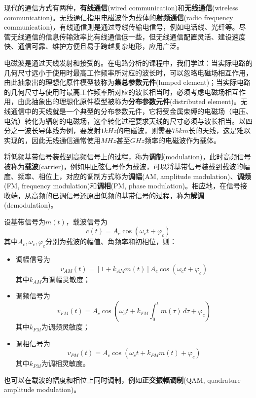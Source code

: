 现代的通信方式有两种\cite{electronic_circuits}，\textbf{有线通信}(wired communication)和\textbf{无线通信}(wireless communication)。无线通信指用电磁波作为载体的\textbf{射频通信}(radio frequency communication)，有线通信则是通过导线传输电信号，例如电话线、光纤等。尽管无线通信的信息传输效率比有线通信低一些，但无线通信配置灵活、建设速度快、通信可靠、维护方便且易于跨越复杂地形，应用广泛。

电磁波是通过天线发射和接受的。在电路分析的课程中，我们学过：当实际电路的几何尺寸远小于使用时最高工作频率所对应的波长时，可以忽略电磁场相互作用，由此抽象出的理想化原件模型被称为\textbf{集总参数元件}(lumped element)；当实际电路的几何尺寸与使用时最高工作频率所对应的波长相当时，必须考虑电磁场相互作用，由此抽象出的理想化原件模型被称为\textbf{分布参数元件}(distributed element)。无线通信中的天线就是一个典型的分布参数元件，它将受金属束缚的电磁场（电压、电流）转化为辐射的电磁场，这个转化过程要求天线的尺寸必须与波长相当。以四分之一波长导体线为例，要发射$1kHz$的电磁波，则需要$75km$长的天线，这是难以实现的，因此无线通信通常使用$MHz$甚至$GHz$频率的电磁波作为载体。

将低频基带信号装载到高频信号上的过程，称为\textbf{调制}(modulation)，此时高频信号被称为\textbf{载波}(carrier)，例如用正弦信号作为载波，可以将基带信号装载到载波的幅度、频率、相位上，对应的调制方式称为\textbf{调幅}(AM, amplitude modulation)、\textbf{调频}(FM, frequency modulation)和\textbf{调相}(PM, phase modulation)。相应地，在信号接收端，从高频的已调信号还原出低频的基带信号的过程，称为\textbf{解调}(demodulation)。
\begin{definition}[调频、调幅、调相]
    设基带信号为$m(t)$，载波信号为\[c(t)=A_c \cos(\omega_c t+\varphi_c)\]
    其中$A_c,\omega_c,\varphi_c$分别为载波的幅值、角频率和初相位，则：
    \begin{itemize}
        \item 调幅信号为\[v_{AM}(t)=[1+k_{AM} m(t)]A_c \cos(\omega_c t+\varphi_c)\]其中$k_{AM}$为调幅灵敏度；
        \item 调频信号为\[v_{FM}(t)=A_c \cos\left(\omega_c t+k_{FM}\int_{0}^{t}m(\tau)\,d\tau+\varphi_c\right)\]其中$k_{FM}$为调频灵敏度；
        \item 调相信号为\[v_{PM}(t)=A_c \cos\left(\omega_c t+k_{PM} m(t)+\varphi_c\right)\]其中$k_{PM}$为调相灵敏度。
    \end{itemize}
\end{definition}
也可以在载波的幅度和相位上同时调制，例如\textbf{正交振幅调制}(QAM, quadrature amplitude modulation)。

